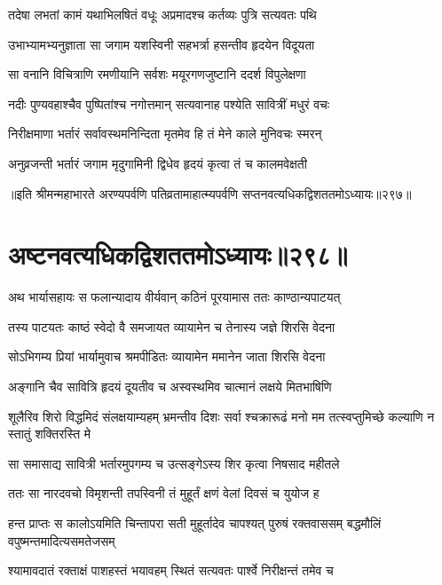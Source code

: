 \twolineshloka
{तदेषा लभतां कामं यथाभिलषितं वधूः}
{अप्रमादश्च कर्तव्यः पुत्रि सत्यवतः पथि}




\twolineshloka
{उभाभ्यामभ्यनुज्ञाता सा जगाम यशस्विनी}
{सहभर्त्रा हसन्तीव हृदयेन विदूयता}


\twolineshloka
{सा वनानि विचित्राणि रमणीयानि सर्वशः}
{मयूरगणजुष्टानि ददर्श विपुलेक्षणा}


\twolineshloka
{नदीः पुण्यवहाश्चैव पुष्पितांश्च नगोत्तमान्}
{सत्यवानाह पश्येति सावित्रीं मधुरं वचः}


\twolineshloka
{निरीक्षमाणा भर्तारं सर्वावस्थमनिन्दिता}
{मृतमेव हि तं मेने काले मुनिवचः स्मरन्}


\twolineshloka
{अनुव्रजन्ती भर्तारं जगाम मृदुगामिनी}
{द्विधेव हृदयं कृत्वा तं च कालमवेक्षती}


॥इति श्रीमन्महाभारते अरण्यपर्वणि पतिव्रतामाहात्म्यपर्वणि सप्तनवत्यधिकद्विशततमोऽध्यायः॥२९७॥


\chapter{अष्टनवत्यधिकद्विशततमोऽध्यायः॥२९८॥}


\twolineshloka
{अथ भार्यासहायः स फलान्यादाय वीर्यवान्}
{कठिनं पूरयामास ततः काण्ठान्यपाटयत्}


\twolineshloka
{तस्य पाटयतः काष्ठं स्वेदो वै समजायत}
{व्यायामेन च तेनास्य जज्ञे शिरसि वेदना}


\twolineshloka
{सोऽभिगम्य प्रियां भार्यामुवाच श्रमपीडितः}
{व्यायामेन ममानेन जाता शिरसि वेदना}


\twolineshloka
{अङ्गानि चैव सावित्रि हृदयं दूयतीव च}
{अस्वस्थमिव चात्मानं लक्षये मितभाषिणि}


\threelineshloka
{शूलैरिव शिरो विद्धमिदं संलक्षयाम्यहम्}
{भ्रमन्तीव दिशः सर्वा श्चक्रारूढं मनो मम}
{तत्स्वप्तुमिच्छे कल्याणि न स्तातुं शक्तिरस्ति मे}


\twolineshloka
{सा समासाद्य सावित्री भर्तारमुपगम्य च}
{उत्सङ्गेऽस्य शिर कृत्वा निषसाद महीतले}


\twolineshloka
{ततः सा नारदवचो विमृशन्ती तपस्विनी}
{तं मुहूर्तं क्षणं वेलां दिवसं च युयोज ह}


\threelineshloka
{हन्त प्राप्तः स कालोऽयमिति चिन्तापरा सती}
{मुहूर्तादेव चापश्यत् पुरुषं रक्तवाससम्}
{बद्धमौलिं वपुष्मन्तमादित्यसमतेजसम्}


\twolineshloka
{श्यामावदातं रक्ताक्षं पाशहस्तं भयावहम्}
{स्थितं सत्यवतः पार्श्वे निरीक्षन्तं तमेव च}


